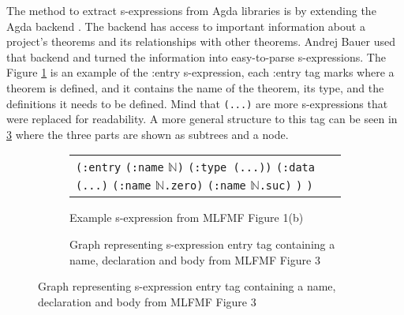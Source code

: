 
The method to extract s-expressions from Agda libraries is by extending the
Agda backend \cite{andrej}. The backend has access to important information about a
project's theorems and its relationships with other theorems. Andrej Bauer used
that backend and turned the information into easy-to-parse s-expressions. The
Figure \cref{fig:example-sexp} is an example of the :entry s-expression, each
:entry tag marks where a theorem is defined, and it contains the name of the
theorem, its type, and the definitions it needs to be defined. Mind that
\texttt{(...)} are more s-expressions that were replaced for readability. A
more general structure to this tag can be seen in \cref{fig:sexp-ast}
where the three parts are shown as subtrees and a node.

\begin{figure}[H]
  \begin{subfigure}[b]{0.40\textwidth}
    \centering
    \begin{tabular}{p{5cm}}
      \texttt{(:entry}\newline
      \hphantom{oo}\texttt{(:name} $\mathbb{N}$\texttt{)}\newline
      \hphantom{oo}\texttt{(:type (...))}\newline
      \hphantom{oo}\texttt{(:data}\newline
      \hphantom{oooo}\texttt{(...)}\newline
      \hphantom{oooo}\texttt{(:name} $\mathbb{N}$\texttt{.zero)}\newline
      \hphantom{oooo}\texttt{(:name} $\mathbb{N}$\texttt{.suc)}\newline
      \hphantom{oo}\texttt{)}\newline
      \texttt{)}
    \end{tabular}
    \caption{Example s-expression from MLFMF Figure 1(b) \cite{bauer2023mlfmf}}
    \label{fig:example-sexp}
  \end{subfigure} \hfill
  \begin{subfigure}[b]{0.50\textwidth}
    \centering
    \caption{Graph representing s-expression entry tag containing a name,
    declaration and body from MLFMF Figure 3 \cite{bauer2023mlfmf}}
    \label{fig:sexp-ast}
  \end{subfigure}
\end{figure}

